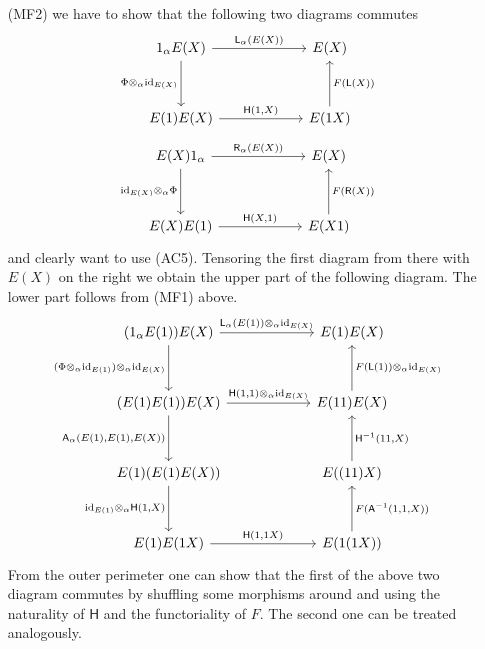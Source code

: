 \begin{prf}[Sketch]
\begin{enumerate}
\item[(MF2)]
we have to show that the following two diagrams commutes
\begin{equation*}
\begin{tikzcd}[row sep=3.3em,column sep=6em]
  1_{\alpha} E(X)
  \ar{r}{\mathsf{L}_{\alpha}(E(X))}
  \ar{d}[swap]{\Phi \otimes_{\alpha} \mathrm{id}_{E(X)}}
  &
  E(X)
  \\
  E(1) E(X)
  \ar{r}{\mathsf{H}(1,X)}
  &
  E(1 X)
  \ar{u}[swap]{F(\mathsf{L}(X))}
\end{tikzcd}
\end{equation*}
\begin{equation*}
\begin{tikzcd}[row sep=3.3em,column sep=6em]
  E(X) 1_{\alpha}
  \ar{r}{\mathsf{R}_{\alpha}(E(X))}
  \ar{d}[swap]{\mathrm{id}_{E(X)} \otimes_{\alpha} \Phi}
  &
  E(X)
  \\
  E(X) E(1)
  \ar{r}{\mathsf{H}(X,1)}
  &
  E(X 1)
  \ar{u}[swap]{F(\mathsf{R}(X))}
\end{tikzcd}
\end{equation*}
and clearly want to use (AC5). Tensoring the first diagram from there with $E(X)$ on the right we obtain the upper part of the following diagram. The lower part follows from (MF1) above.
\begin{equation*}
\begin{tikzcd}[row sep=3.3em,column sep=6em]
  (1_{\alpha} E(1)) E(X)
  \ar{r}{\mathsf{L}_{\alpha}(E(1)) \otimes_{\alpha} \mathrm{id}_{E(X)}}
  \ar{d}[swap]{(\Phi \otimes_{\alpha} \mathrm{id}_{E(1)}) \otimes_{\alpha} \mathrm{id}_{E(X)}}
  &
  E(1) E(X)
  \\
  (E(1) E(1)) E(X)
  \ar{r}{\mathsf{H}(1,1) \otimes_{\alpha} \mathrm{id}_{E(X)}}
  \ar{d}[swap]{\mathsf{A}_{\alpha}(E(1),E(1),E(X))}
  &
  E(1 1) E(X)
  \ar{u}[swap]{F(\mathsf{L}(1)) \otimes_{\alpha} \mathrm{id}_{E(X)}}
  \\
  E(1) (E(1) E(X))
  \ar{d}[swap]{\mathrm{id}_{E(1)} \otimes_{\alpha} \mathsf{H}(1,X)}
  &
  E((1 1) X)
  \ar{u}[swap]{\mathsf{H}^{-1}(1 1,X)}
  \\
  E(1) E(1 X)
  \ar{r}{\mathsf{H}(1,1 X)}
  &
  E(1 (1 X))
  \ar{u}[swap]{F(\mathsf{A}^{-1}(1,1,X))}
\end{tikzcd}
\end{equation*}
From the outer perimeter one can show that the first of the above two diagram commutes by shuffling some morphisms around and using the naturality of $\mathsf{H}$ and the functoriality of $F$. The second one can be treated analogously.
\end{enumerate}

\end{prf}
